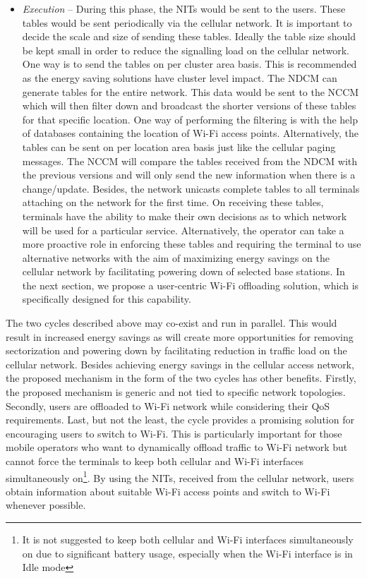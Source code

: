 \documentclass[journal]{IEEEtran}
\begin{document}
\begin{itemize}
\item \emph{Execution} -- During this phase, the NITs would be sent to the users. These tables would be sent periodically via the cellular network. It is important to decide the scale and size of sending these tables. Ideally the table size should be kept small in order to reduce the signalling load on the cellular network. One way is to send the tables on per cluster area basis. This is recommended as the energy saving solutions have cluster level impact. The NDCM can generate tables for the entire network. This data would be sent to the NCCM which will then filter down and broadcast the shorter versions of these tables for that specific location. One way of performing the filtering is with the help of databases containing the location of Wi-Fi access points. Alternatively, the tables can be sent on per location area basis just like the cellular paging messages. The NCCM will compare the tables received from the NDCM with the previous versions and will only send the new information when there is a change/update. Besides, the network unicasts complete tables to all terminals attaching on the network for the first time. On receiving these tables, terminals have the ability to make their own decisions as to which network will be used for a particular service. Alternatively, the operator can take a more proactive role in enforcing these tables and requiring the terminal to use alternative networks with the aim of maximizing energy savings on the cellular network by facilitating powering down of selected base stations. In the next section, we propose a user-centric Wi-Fi offloading solution, which is specifically designed for this capability.  






\end{itemize}

The two  cycles described above may co-exist and run in parallel. This would result in increased energy savings as  will create more opportunities for removing sectorization and powering down by facilitating reduction in traffic load on the cellular network.  Besides achieving energy savings in the cellular access network, the proposed mechanism in the form of the two  cycles has other benefits. Firstly, the proposed mechanism is generic and not tied to specific network topologies. Secondly, users are offloaded to Wi-Fi network while considering their QoS requirements. Last, but not the least, the  cycle provides a promising solution for  encouraging users to switch to Wi-Fi. This is particularly important for those mobile operators who want to dynamically offload traffic to Wi-Fi network but cannot force the terminals to keep both cellular and Wi-Fi interfaces simultaneously on\footnote{It is not suggested to keep both cellular and Wi-Fi interfaces simultaneously on due to significant battery usage, especially when the Wi-Fi interface is in Idle mode}. By using the NITs, received from the cellular network, users obtain information about suitable Wi-Fi access points and switch to Wi-Fi whenever possible. 
\end{document}
